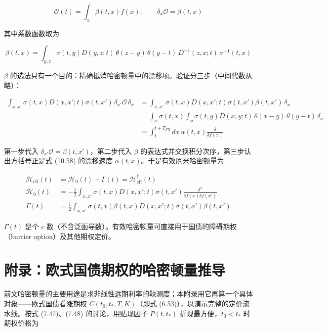 \begin{equation*}
\mathcal{O}(t)=\int_x\beta(t,x)f(x);\qquad \delta_x\mathcal{O}=\beta(t,x)
\end{equation*}

其中系数函数取为

\begin{equation*}
\beta(t,x)=\int_{y,z}\sigma(t,y)D(y,z;t)\,\theta(z-y)\,\theta(y-t)\,D^{-1}(z,x;t)\,\sigma^{-1}(t,x)
\end{equation*}

$\beta$ 的选法只有一个目的：精确抵消哈密顿量中的漂移项。验证分三步（中间代数从略）：

\begin{equation*}
\begin{aligned}
\int_{x,x'}\sigma(t,x)D(x,x';t)\sigma(t,x')\,\delta_{x'}\mathcal{O}\,\delta_x
&=\int_{x,x'}\sigma(t,x)D(x,x';t)\sigma(t,x')\beta(t,x')\,\delta_x\\
&=\int_x\sigma(t,x)\int_y\sigma(t,y)D(x,y;t)\,\theta(x-y)\,\theta(y-t)\,\delta_x\\
&=\int_t^{t+T_{FR}}dx\,\alpha(t,x)\frac{\delta}{\delta f(x)}
\end{aligned}
\end{equation*}

第一步代入 $\delta_{x'}\mathcal{O}=\beta(t,x')$，第二步代入 $\beta$ 的表达式并交换积分次序，第三步认出方括号正是式 (10.58) 的漂移速度 $\alpha(t,x)$。于是有效厄米哈密顿量为

\begin{equation*}
\begin{aligned}
\mathcal{H}_{\text{eff}}(t)&=\mathcal{H}_0(t)+\Gamma(t)=\mathcal{H}_{\text{eff}}^\dagger(t)\\
\mathcal{H}_0(t)&=-\frac{1}{2}\int_{x,x'}\sigma(t,x)D(x,x';t)\sigma(t,x')\frac{\delta^2}{\delta f(x)\delta f(x')}\\
\Gamma(t)&=\frac{1}{2}\int_{x,x'}\sigma(t,x)\beta(t,x)D(x,x';t)\sigma(t,x')\beta(t,x')
\end{aligned}
\end{equation*}

$\Gamma(t)$ 是个 $c$ 数（不含泛函导数）。有效哈密顿量可直接用于国债的障碍期权（barrier option）及其他期权定价。

\section{附录：欧式国债期权的哈密顿量推导}

前文哈密顿量的主要用途是求非线性远期利率的鞅测度；本附录用它再算一个具体对象——欧式国债看涨期权 $C(t_0,t_*,T,K)$（即式 (6.53)），以演示完整的定价流水线。按式 (7.47)、(7.48) 的讨论，用贴现因子 $P(t,t_*)$ 折现最方便，$t_0<t_*$ 时期权价格为

